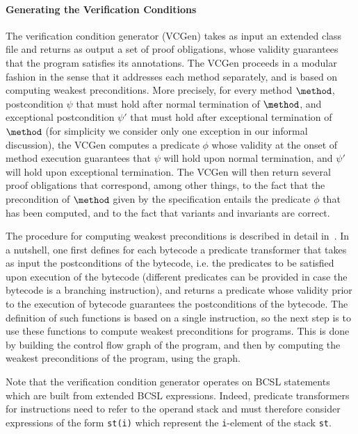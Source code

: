 \paragraph{Generating the Verification Conditions}\label{subsec:verification}
The verification condition generator (VCGen) takes as input an
extended class file and returns as output a set of proof obligations,
whose validity guarantees that the program satisfies its
annotations. The VCGen proceeds in a modular fashion in the sense that
it addresses each method separately, and is based on computing weakest
preconditions. More precisely, for every method $\method$,
postcondition $\psi$ that must hold after normal termination of
$\method$, and exceptional postcondition $\psi'$ that must hold after
exceptional termination of $\method$ (for simplicity we consider only
one exception in our informal discussion), the VCGen computes a
predicate $\phi$ whose validity at the onset of method execution
guarantees that $\psi$ will hold upon normal termination, and $\psi'$
will hold upon exceptional termination. The VCGen will then return
several proof obligations that correspond, among other things, to the
fact that the precondition of $\method$ given by the specification
entails the predicate $\phi$ that has been computed, and to the fact
that variants and invariants are correct.


The procedure for computing weakest preconditions is described in
detail in~\cite{LM05:acc}. In a nutshell, one first defines for each
bytecode a predicate transformer that takes as input the
postconditions of the bytecode, i.e. the predicates to be satisfied
upon execution of the bytecode (different predicates can be provided
in case the bytecode is a branching instruction), and returns a
predicate whose validity prior to the execution of bytecode guarantees
the postconditions of the bytecode. The definition of such functions
is based on a single instruction, so the next step is to use these
functions to compute weakest preconditions for programs.  This is done
by building the control flow graph of the program, and then by
computing the weakest preconditions of the program, using the graph.

Note that the verification condition generator operates on BCSL
statements which are built from extended BCSL expressions. Indeed,
predicate transformers for instructions need to refer to the operand
stack and must therefore consider expressions of the form
\verb!st(i)! which represent the \verb!i!-element of the stack \verb!st!.

